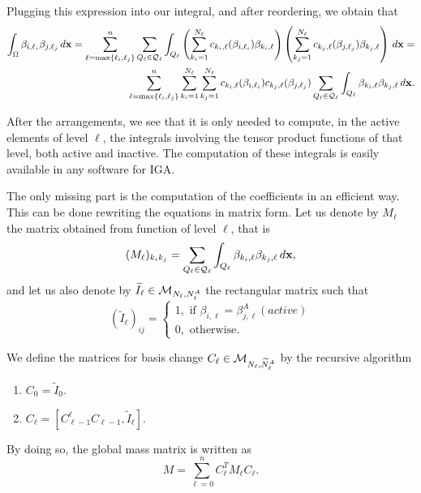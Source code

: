 \documentclass[a4paper]{siamltex1213}
\newcommand\QQ{\mathcal Q}
\newcommand{\bx}{{\bf x}}
\let\tilde\widetilde
\begin{document}
Plugging this expression into our integral, and after reordering, we obtain that 
\begin{align*}
\int_\Omega \beta_{i,\ell_i} \beta_{j,\ell_j} \, d\bx = \sum_{\ell = \max\{\ell_i, \ell_j\}}^n \sum_{Q_\ell \in \QQ_\ell}  \int_{Q_\ell} \left(\sum_{k_i=1}^{N_\ell} c_{k_i,\ell}(\beta_{i,\ell_i}) \beta_{k_i,\ell}\right) \left(\sum_{k_j=1}^{N_\ell} c_{k_j,\ell}(\beta_{j,\ell_j}) \beta_{k_j,\ell}\right) \, d\bx = \\
\sum_{\ell = \max\{\ell_i, \ell_j\}}^n \sum_{k_i=1}^{N_\ell} \sum_{k_j=1}^{N_\ell} c_{k_i,\ell}(\beta_{i,\ell_i}) c_{k_j,\ell}(\beta_{j,\ell_j}) \sum_{Q_\ell \in \QQ_\ell}  \int_{Q_\ell}  \beta_{k_i,\ell}  \beta_{k_j,\ell} \, d\bx.
\end{align*}

After the arrangements, we see that it is only needed to compute, in the active elements of level $\ell$, the integrals involving the tensor product functions of that level, both active and inactive. The computation of these integrals is easily available in any software for IGA. 

The only missing part is the computation of the coefficients in an efficient way. This can be done rewriting the equations in matrix form. Let us denote by $M_\ell$ the matrix obtained from function of level $\ell$, that is
\begin{equation*}
(M_\ell)_{k_i k_j} = \sum_{Q_\ell \in \QQ_\ell}  \int_{Q_\ell}  \beta_{k_i,\ell}  \beta_{k_j,\ell} \, d\bx,
\end{equation*}
and let us also denote by $\tilde I_\ell \in {\cal M}_{N_\ell, N^A_\ell}$ the rectangular matrix such that 
$$
(\tilde I_\ell)_{ij} = \left \{ 
\begin{array}{l}
1, \text{ if }  \beta_{i,\ell} = \beta^A_{j,\ell} (active)\\
0, \text{ otherwise. }
\end{array}
\right.$$

We define the matrices for basis change $C_\ell \in {\cal M}_{N_\ell, \tilde N^A_\ell}$ by the recursive algorithm
\begin{enumerate}
\item $C_0 = \tilde I_0$.
\item $C_\ell = [C_{\ell-1}^\ell C_{\ell-1}, \tilde I_\ell]$.
\end{enumerate}

By doing so, the global mass matrix is written as
\begin{equation*}
M = \sum_{\ell = 0}^n C^T_\ell M_\ell C_\ell.
\end{equation*}
\end{document}
